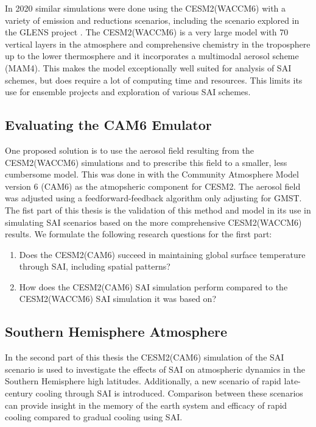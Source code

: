 In 2020 similar simulations were done using the CESM2(WACCM6) with a variety of emission and reductions scenarios, including the scenario explored in the GLENS project \parencite{tilmes2020}. The CESM2(WACCM6) is a very large model with 70 vertical layers in the atmosphere and comprehensive chemistry in the troposphere up to the lower thermosphere and it incorporates a multimodal aerosol scheme (MAM4). This makes the model exceptionally well suited for analysis of SAI schemes, but does require a lot of computing time and resources. This limits its use for ensemble projects and exploration of various SAI schemes. 

\subsection{Evaluating the CAM6 Emulator}
One proposed solution is to use the aerosol field resulting from the CESM2(WACCM6) simulations and to prescribe this field to a smaller, less cumbersome model. This was done in \textcite{pfluger2024} with the Community Atmosphere Model version 6 (CAM6) as the atmopsheric component for CESM2. The aerosol field was adjusted using a feedforward-feedback algorithm only adjusting for GMST. The fist part of this thesis is the validation of this method and model in its use in simulating SAI scenarios based on the more comprehensive CESM2(WACCM6) results. 
We formulate the following research questions for the first part:

\begin{enumerate}
    \item Does the CESM2(CAM6) succeed in maintaining global surface temperature through SAI, including spatial patterns?
    \item How does the CESM2(CAM6) SAI simulation perform  compared to the CESM2(WACCM6) SAI simulation it was based on?
\end{enumerate}

\subsection{Southern Hemisphere Atmosphere}
In the second part of this thesis the CESM2(CAM6) simulation of the SAI scenario is used to investigate the effects of SAI on atmospheric dynamics in the Southern Hemisphere high latitudes. Additionally, a new scenario of rapid late-century cooling through SAI is introduced. Comparison between these scenarios can provide insight in the memory of the earth system and efficacy of rapid cooling compared to gradual cooling using SAI. 

